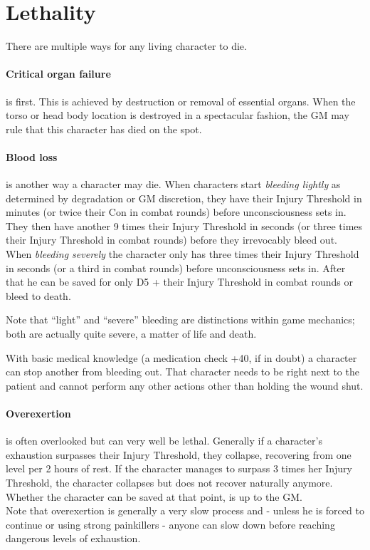 \documentclass[11pt,a4paper,openany,dvipsnames]{book}
\begin{document}
	\section{Lethality}
	\label{sec:lethality}
	There are multiple ways for any living character to die.
	\paragraph{Critical organ failure}is first. This is achieved by destruction or removal of essential organs. When the torso or head body location is destroyed in a spectacular fashion, the GM may rule that this character has died on the spot.
	\paragraph{Blood loss}is another way a character may die. When characters start \emph{bleeding lightly} as determined by degradation or GM discretion, they have their Injury Threshold in minutes (or twice their Con in combat rounds) before unconsciousness sets in.
	They then have another 9 times their Injury Threshold in seconds (or three times their Injury Threshold in combat rounds) before they irrevocably bleed out.
    When \emph{bleeding severely} the character only has three times their Injury Threshold in seconds (or a third in combat rounds) before unconsciousness sets in.
	After that he can be saved for only D5 + their Injury Threshold in combat rounds or bleed to death.
	\begin{exampleblock}
		Note that “light” and “severe” bleeding are distinctions within game mechanics;
		both are actually quite severe, a matter of life and death.
	\end{exampleblock}
	With basic medical knowledge (a medication check +40, if in doubt) a character can stop another from bleeding out. That character needs to be right next to the patient and cannot perform any other actions other than holding the wound shut.
	\paragraph{Overexertion} is often overlooked but can very well be lethal. Generally if a character’s exhaustion surpasses their Injury Threshold, they collapse, recovering from one level per 2 hours of rest.
    If the character manages to surpass 3 times her Injury Threshold, the character collapses but does not recover naturally anymore.
    Whether the character can be saved at that point, is up to the GM.\\
	Note that overexertion is generally a very slow process
		and - unless he is forced to continue or using strong painkillers -
		anyone can slow down before reaching dangerous levels of exhaustion.
\end{document}
